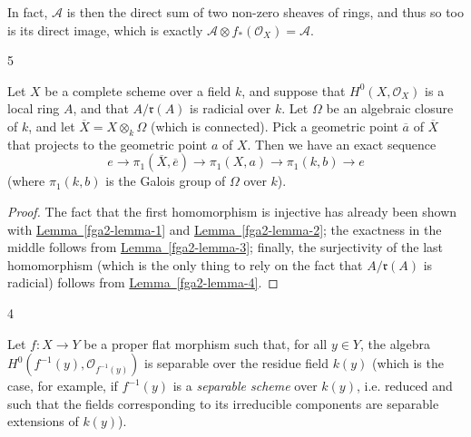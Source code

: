   In fact, \(\mathscr {A}\) is then the direct sum of two non-zero sheaves of rings, and thus so too is its direct image, which is exactly \(\mathscr {A}\otimes  f_*(\mathcal {O}_X)=\mathscr {A}\).\begin{lemma}{5}\label{fga2-lemma-5}\skipsinglepar\par{}Let \(X\) be a complete scheme over a field \(k\), and suppose that \(H^0(X,\mathcal {O}_X)\) is a local ring \(A\), and that \(A/\mathfrak {r}(A)\) is radicial over \(k\).
    Let \(\Omega \) be an algebraic closure of \(k\), and let \(\overline {X}=X\otimes _k\Omega \) (which is connected).
    Pick a geometric point \(\overline {a}\) of \(\overline {X}\) that projects to the geometric point \(a\) of \(X\).
    Then we have an exact sequence
    \[       e       \to  \pi _1(\overline {X},\overline {e})       \to  \pi _1(X,a)       \to  \pi _1(k,b)       \to  e     \]
    (where \(\pi _1(k,b)\) is the Galois group of \(\Omega \) over \(k\)).\begin{proof}\par{}The fact that the first homomorphism is injective has already been shown with \hyperref[fga2-lemma-1]{Lemma~\ref*{fga2-lemma-1}} and \hyperref[fga2-lemma-2]{Lemma~\ref*{fga2-lemma-2}};
      the exactness in the middle follows from \hyperref[fga2-lemma-3]{Lemma~\ref*{fga2-lemma-3}};
      finally, the surjectivity of the last homomorphism (which is the only thing to rely on the fact that \(A/\mathfrak {r}(A)\) is radicial) follows from \hyperref[fga2-lemma-4]{Lemma~\ref*{fga2-lemma-4}}.\end{proof}\end{lemma}\begin{proposition}{4}\label{fga2-proposition-4}\skipsinglepar\par{}Let \(f\colon  X\to  Y\) be a proper flat morphism such that, for all \(y\in  Y\), the algebra \(H^0(f^{-1}(y),\mathcal {O}_{f^{-1}(y)})\) is separable over the residue field \(k(y)\) (which is the case, for example, if \(f^{-1}(y)\) is a \emph{separable scheme} over \(k(y)\), i.e. reduced and such that the fields corresponding to its irreducible components are separable extensions of \(k(y)\)).
    

\end{proposition}
